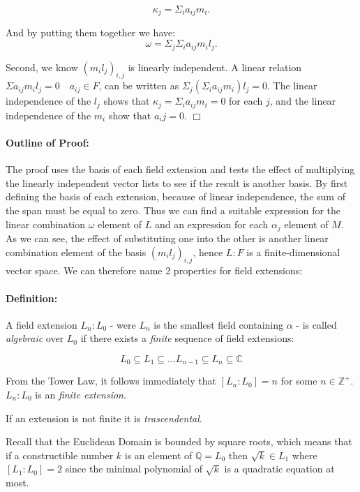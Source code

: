 \documentclass{article}
\begin{document}
$$\kappa_j = \Sigma_i a_{ij} m_i.$$

And by putting them together we have:
$$\omega = \Sigma_j \Sigma_i a_{ij} m_i l_j.$$

Second, we know $(m_i l_j)_{i,j}$ is linearly independent. A linear relation $\Sigma a_{ij} m_i l_j = 0 \quad a_{ij}\in F$, can be written as $\Sigma_j (\Sigma_i a_{ij} m_i) l_j = 0$. The linear independence of the $l_j$  shows that $\kappa_j = \Sigma_i a_{ij} m_i = 0$ for each $j$, and the linear independence of the $m_i$ show that $a_ij = 0$. $\Box$

\paragraph{Outline of Proof:}
The proof uses the basis of each field extension and tests the effect of multiplying the linearly independent vector lists to see if the result is another basis. By first defining the basis of each extension, because of linear independence, the sum of the span must be equal to zero. Thus we can find a suitable expression for the linear combination $\omega$ element of $L$ and an expression for each $\alpha_j$ element of $M$. As we can see, the effect of substituting one into the other is another linear combination element of the basis $(m_i l_j)_{i,j}$, hence $L: F$ is a finite-dimensional vector space. We can therefore name 2 properties for field extensions:


\paragraph{Definition:} A field extension $L_n:L_0$ - were $L_n$ is the smallest field containing $\alpha$ - is called \textit{algebraic} over $L_0$ if there exists a \textit{finite} sequence of field extensions:

$$L_0 \subseteq L_1 \subseteq ... L_{n-1} \subseteq L_n \subseteq \mathbb{C} $$

From the Tower Law, it follows immediately that $ [ L_n : L_0 ] = n$ for some $n\in\mathbb{Z}^{+}$. $L_n:L_0$ is an \textit{finite extension}.

\par
If an extension is not finite it is \textit{trascendental}.
\par
Recall that the Euclidean Domain is bounded by square roots, which means that if a constructible number $k$ is an element of $\mathbb{Q} = L_0$ then $\sqrt{k}\in L_1$ where $[ L_1: L_0 ] = 2$ since the minimal polynomial of $\sqrt{k}$ is a quadratic equation at most.
\end{document}
